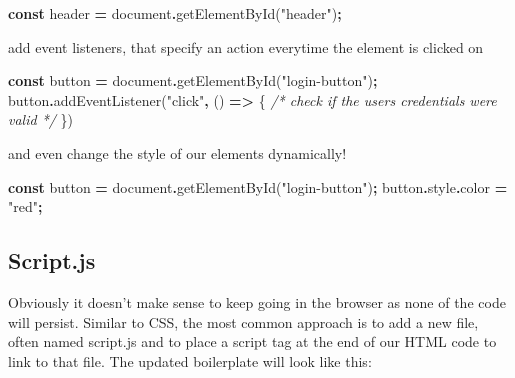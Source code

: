 \documentclass[
]{book}
\newenvironment{Shaded}{\begin{snugshade}}{\end{snugshade}}
\newcommand{\AttributeTok}[1]{\textcolor[rgb]{0.77,0.63,0.00}{#1}}
\newcommand{\BuiltInTok}[1]{#1}
\newcommand{\CommentTok}[1]{\textcolor[rgb]{0.56,0.35,0.01}{\textit{#1}}}
\newcommand{\FunctionTok}[1]{\textcolor[rgb]{0.00,0.00,0.00}{#1}}
\newcommand{\KeywordTok}[1]{\textcolor[rgb]{0.13,0.29,0.53}{\textbf{#1}}}
\newcommand{\NormalTok}[1]{#1}
\newcommand{\OperatorTok}[1]{\textcolor[rgb]{0.81,0.36,0.00}{\textbf{#1}}}
\newcommand{\StringTok}[1]{\textcolor[rgb]{0.31,0.60,0.02}{#1}}
\begin{document}
\begin{Shaded}
\begin{Highlighting}[]
\KeywordTok{const}\NormalTok{ header }\OperatorTok{=} \BuiltInTok{document}\OperatorTok{.}\FunctionTok{getElementById}\NormalTok{(}\StringTok{"header"}\NormalTok{)}\OperatorTok{;}
\end{Highlighting}
\end{Shaded}

add event listeners, that specify an action everytime the element is clicked on

\begin{Shaded}
\begin{Highlighting}[]
\KeywordTok{const}\NormalTok{ button }\OperatorTok{=} \BuiltInTok{document}\OperatorTok{.}\FunctionTok{getElementById}\NormalTok{(}\StringTok{"login{-}button"}\NormalTok{)}\OperatorTok{;}
\NormalTok{button}\OperatorTok{.}\FunctionTok{addEventListener}\NormalTok{(}\StringTok{"click"}\OperatorTok{,}\NormalTok{ () }\KeywordTok{=\textgreater{}}\NormalTok{ \{}
  \CommentTok{/* check if the user\textquotesingle{}s credentials were valid */}
\NormalTok{\})}
\end{Highlighting}
\end{Shaded}

and even change the style of our elements dynamically!

\begin{Shaded}
\begin{Highlighting}[]
\KeywordTok{const}\NormalTok{ button }\OperatorTok{=} \BuiltInTok{document}\OperatorTok{.}\FunctionTok{getElementById}\NormalTok{(}\StringTok{"login{-}button"}\NormalTok{)}\OperatorTok{;}
\NormalTok{button}\OperatorTok{.}\AttributeTok{style}\OperatorTok{.}\AttributeTok{color} \OperatorTok{=} \StringTok{"red"}\OperatorTok{;}
\end{Highlighting}
\end{Shaded}

\hypertarget{script.js}{%
\subsection*{Script.js}\label{script.js}}

Obviously it doesn't make sense to keep going in the browser as none of the code will persist. Similar to CSS, the most common approach is to add a new file, often named script.js and to place a script tag at the end of our HTML code to link to that file. The updated boilerplate will look like this:
\end{document}

